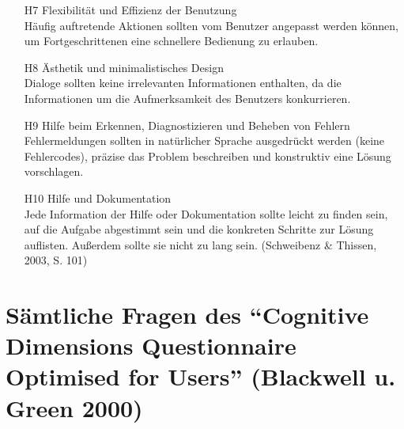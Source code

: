\begin{enumerate}
    \item[H7] Flexibilität und Effizienz der Benutzung
        \\Häufig auftretende Aktionen sollten vom Benutzer angepasst werden können, um Fortgeschrittenen eine schnellere Bedienung zu erlauben.
    \item[H8] Ästhetik und minimalistisches Design
        \\Dialoge sollten keine irrelevanten Informationen enthalten, da die Informationen um die Aufmerksamkeit des Benutzers konkurrieren.
    \item[H9] Hilfe beim Erkennen, Diagnostizieren und Beheben von Fehlern
        \\Fehlermeldungen sollten in natürlicher Sprache ausgedrückt werden (keine Fehlercodes), präzise das Problem beschreiben und konstruktiv eine Lösung vorschlagen.
    \item[H10] Hilfe und Dokumentation
        \\Jede Information der Hilfe oder Dokumentation sollte leicht zu finden sein, auf die Aufgabe abgestimmt sein und die konkreten Schritte zur Lösung auflisten. Außerdem sollte sie nicht zu lang sein. (Schweibenz \& Thissen, 2003, S. 101)
\end{enumerate}




\section[Cognitive Dimensions Fragebogen]{Sämtliche Fragen des ``Cognitive Dimensions Questionnaire Optimised for Users'' (Blackwell u. Green 2000)}
\label{app:cdf-questions}

